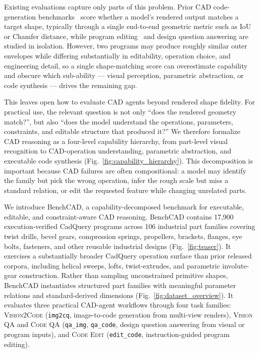 Existing evaluations capture only parts of this problem.
Prior CAD code-generation benchmarks~\citep{Wu2021,Khan2024,Guan2025,Rukhovich2025,Kolodiazhnyi2026,Elistratov2026} score whether a model's rendered output matches a target shape, typically through a single end-to-end geometric metric such as IoU or Chamfer distance, while program editing~\citep{Alrashedy2025,CADEditor2025} and design question answering are studied in isolation.
However, two programs may produce roughly similar outer envelopes while differing substantially in editability, operation choice, and engineering detail, so a single shape-matching score can overestimate capability and obscure which sub-ability --- visual perception, parametric abstraction, or code synthesis --- drives the remaining gap.

This leaves open how to evaluate CAD agents beyond rendered shape fidelity.
For practical use, the relevant question is not only ``does the rendered geometry match?'', but also ``does the model understand the operations, parameters, constraints, and editable structure that produced it?''
We therefore formalize CAD reasoning as a four-level capability hierarchy, from part-level visual recognition to CAD-operation understanding, parametric abstraction, and executable code synthesis (Fig.~\ref{fig:capability_hierarchy}).
This decomposition is important because CAD failures are often compositional: a model may identify the family but pick the wrong operation, infer the rough scale but miss a standard relation, or edit the requested feature while changing unrelated parts.

We introduce BenchCAD, a capability-decomposed benchmark for executable, editable, and constraint-aware CAD reasoning.
BenchCAD contains 17{,}900 execution-verified CadQuery programs across 106 industrial part families covering twist drills, bevel gears, compression springs, propellers, brackets, flanges, eye bolts, fasteners, and other reusable industrial designs (Fig.~\ref{fig:teaser}).
It exercises a substantially broader CadQuery operation surface than prior released corpora, including helical sweeps, lofts, twist-extrudes, and parametric involute-gear construction.
Rather than sampling unconstrained primitive shapes, BenchCAD instantiates structured part families with meaningful parameter relations and standard-derived dimensions (Fig.~\ref{fig:dataset_overview}).
It evaluates three practical CAD-agent workflows through four task families: \textsc{Vision2Code} (\texttt{img2cq}, image-to-code generation from multi-view renders), \textsc{Vision QA} and \textsc{Code QA} (\texttt{qa\_img}, \texttt{qa\_code}, design question answering from visual or program inputs), and \textsc{Code Edit} (\texttt{edit\_code}, instruction-guided program editing).


